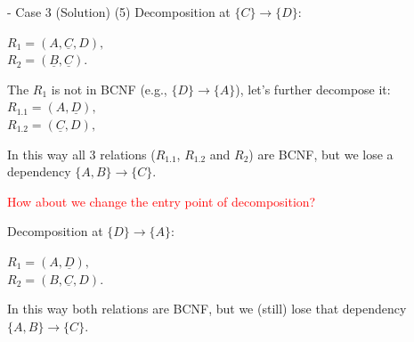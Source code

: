 \begin{frame}[fragile]{ - Case 3 (Solution)}
	(5) Decomposition at $\{C\} \rightarrow \{D\}$:\\\vspace{3pt}
	
	$R_1 = (A, \underline{C}, D),$\\
	$R_2 = (\underline{B}, \underline{C}).$\\\vspace{3pt}
	
	The $R_1$ is not in BCNF (e.g., $\{D\} \rightarrow \{A\}$), let's further decompose it:\\
	$R_{1.1} = (A, \underline{D}),$\\
	$R_{1.2} = (\underline{C}, D),$\\\vspace{3pt}
	
	In this way all 3 relations ($R_{1.1}$, $R_{1.2}$ and $R_{2}$) are BCNF, but we lose a dependency $\{A, B\} \rightarrow \{C\}$.\\\vspace{10pt}
	
	\textcolor{red}{How about we change the entry point of decomposition?}\\\vspace{3pt}
	
	Decomposition at $\{D\} \rightarrow \{A\}$:\\\vspace{3pt}
	
	$R_1 = (A, \underline{D}),$\\
	$R_2 = (B, \underline{C}, D).$\\\vspace{5pt}
	
	In this way both relations are BCNF, but we (still) lose that dependency $\{A, B\} \rightarrow \{C\}$.
\end{frame}

